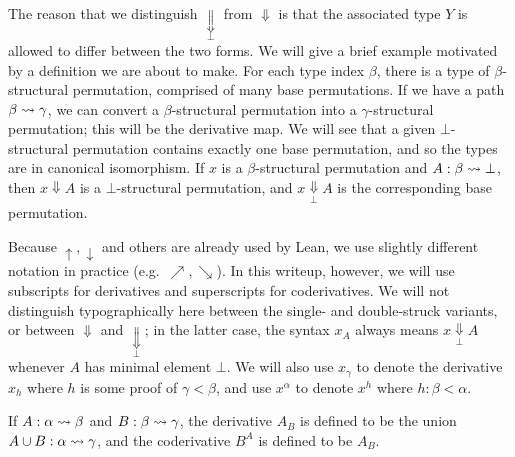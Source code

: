 The reason that we distinguish \( \underset{\bot}{\Downarrow} \) from \( \Downarrow \) is that the associated type \( Y \) is allowed to differ between the two forms.
We will give a brief example motivated by a definition we are about to make.
For each type index \( \beta \), there is a type of \( \beta \)-structural permutation, comprised of many base permutations.
If we have a path \( \beta \rightsquigarrow \gamma \), we can convert a \( \beta \)-structural permutation into a \( \gamma \)-structural permutation; this will be the derivative map.
We will see that a given \( \bot \)-structural permutation contains exactly one base permutation, and so the types are in canonical isomorphism.
If \( x \) is a \( \beta \)-structural permutation and \( A : \beta \rightsquigarrow \bot \), then \( x \Downarrow A \) is a \( \bot \)-structural permutation, and \( x \underset{\bot}{\Downarrow} A \) is the corresponding base permutation.

Because \( \uparrow, \downarrow \) and others are already used by Lean, we use slightly different notation in practice (e.g.\ \( \nearrow, \searrow \)).
In this writeup, however, we will use subscripts for derivatives and superscripts for coderivatives.
We will not distinguish typographically here between the single- and double-struck variants, or between \( \Downarrow \) and \( \underset{\bot}{\Downarrow} \); in the latter case, the syntax \( x_A \) always means \( x \underset{\bot}{\Downarrow} A \) whenever \( A \) has minimal element \( \bot \).
We will also use \( x_\gamma \) to denote the derivative \( x_h \) where \( h \) is some proof of \( \gamma < \beta \), and use \( x^\alpha \) to denote \( x^h \) where \( h : \beta < \alpha \).

\begin{definition-no-bp}
  If \( A : \alpha \rightsquigarrow \beta \) and \( B : \beta \rightsquigarrow \gamma \), the derivative \( A_B \) is defined to be the union \( A \cup B : \alpha \rightsquigarrow \gamma \), and the coderivative \( B^A \) is defined to be \( A_B \).
\end{definition-no-bp}

